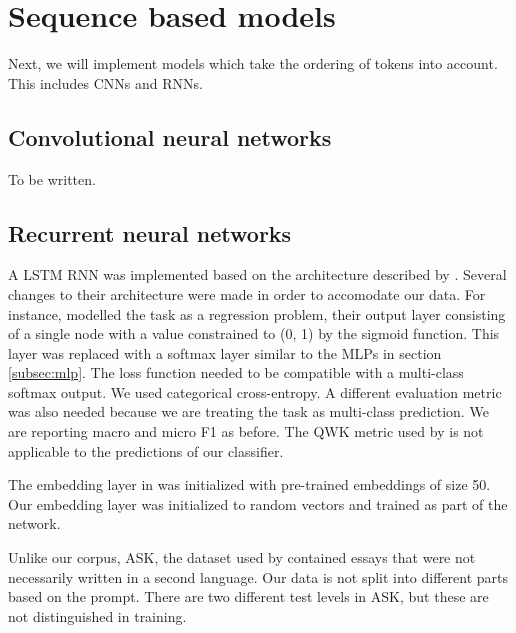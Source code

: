 \chapter{Sequence based models}

Next, we will implement models which take the ordering of tokens into account.
This includes \acp{CNN} and \acp{RNN}. 

\section{Convolutional neural networks}

To be written.

\section{Recurrent neural networks}

A \ac{LSTM} \ac{RNN} was implemented based on the architecture described by
\textcite{taghipour16}. Several changes to their architecture were made in
order to accomodate our data. For instance, \citeauthor{taghipour16} modelled
the task as a regression problem, their output layer consisting of a single
node with a value constrained to (0, 1) by the sigmoid function. This layer
was replaced with a softmax layer similar to the \acp{MLP} in section
\ref{subsec:mlp}. The loss function needed to be compatible with a
multi-class softmax output. We used categorical cross-entropy. A different
evaluation metric was also needed because we are treating the task as
multi-class prediction. We are reporting macro and micro F1 as before. The
\ac{QWK} metric used by \citeauthor{taghipour16} is not applicable to the
predictions of our classifier.

The embedding layer in \textcite{taghipour16} was initialized with
pre-trained embeddings of size 50. Our embedding layer was initialized to
random vectors and trained as part of the network.

Unlike our corpus, ASK, the dataset used by \citeauthor{taghipour16}
contained essays that were not necessarily written in a second language. Our
data is not split into different parts based on the prompt. There are two
different test levels in ASK, but these are not distinguished in training.

